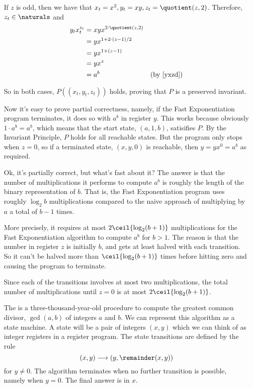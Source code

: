 If $z$ is odd, then we have that $x_t = x^2, y_t = xy, z_t =
\quotient(z,2)$. Therefore, $z_t \in \naturals$ and
\begin{align*}
y_tx_t^{z_t} & = xyx^{2 \cdot \quotient(z,2)}\\
& = yx^{1+2 \cdot (z-1)/2}\\
& = yx^{1+(z-1)}\\
& = yx^z\\
& = a^b & \mbox{(by~\eqref{yxzd})}
\end{align*}

So in both cases, $P((x_t,y_t,z_t))$ holds, proving that $P$ is a
preserved invariant.

Now it's easy to prove partial correctness, namely, if the Fast
Exponentiation program terminates, it does so with $a^b$ in register
$y$.  This works because obviously $1\cdot a^b = a^b$, which means
that the start state, $(a,1,b)$, satisifies $P$.  By the Invariant
Principle, $P$ holds for all reachable states.  But the program
only stops when $z = 0$, so if a terminated state, $(x,y,0)$ is
reachable, then $y = yx^0 = a^b$ as required.

Ok, it's partially correct, but what's fast about it?  The answer is
that the number of multiplications it performs to compute $a^b$ is
roughly the length of the binary representation of $b$.  That is, the
Fast Exponentiation program uses roughly $\log_2 b$ multiplications
compared to the naive approach of multiplying by $a$ a total of $b-1$
times.

More precisely, it requires at most $2 \ceil{\log_2 (b+1)}$
multiplications for the Fast Exponentiation algorithm to compute $a^b$
for $b>1$.  The reason is that the number in register $z$ is initially
$b$, and gets at least halved with each transition.  So it can't be
halved more than $\ceil{\log_2 (b+1)}$ times before hitting zero and
causing the program to terminate.
\iffalse
The $(b+1)$ comes in
because for $b = 2^p$, a power of two, it takes $(p+1)$ halves to get
zero.
\fi
Since each of the transitions involves at most two multiplications,
the total number of multiplications until $z=0$ is at most
$2\ceil{\log_2 (b+1)}$.


\iffalse
The  is a
three-thousand-year-old procedure to compute the greatest common divisor,
$\gcd(a,b)$ of integers $a$ and $b$.  We can represent this algorithm as a
state machine.  A state will be a pair of integers $(x,y)$ which we can
think of as integer registers in a register program.  The state
transitions are defined by the rule
\[
(x,y) \movesto (y, \remainder(x,y))
\]
for $y \neq 0$.  The algorithm terminates when no further transition is
possible, namely when $y=0$.  The final answer is in $x$.

